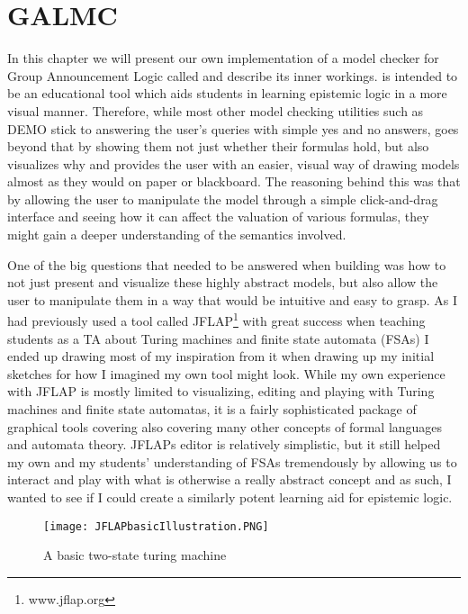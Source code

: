 \section{GALMC}\label{sec:impl}

In this chapter we will present our own implementation of a model checker for Group Announcement Logic called \cname{} and describe its inner workings. \cname{} is intended to be an educational tool which aids students in learning epistemic logic in a more visual manner. Therefore, while most other model checking utilities such as DEMO \cite{JanvanEijck} stick to answering the user's queries with simple yes and no answers, \cname{} goes beyond that by showing them not just whether their formulas hold, but also visualizes why and provides the user with an easier, visual way of drawing models almost as they would on paper or blackboard. The reasoning behind this was that by allowing the user to manipulate the model through a simple click-and-drag interface and seeing how it can affect the valuation of various formulas, they might gain a deeper understanding of the semantics involved.

One of the big questions that needed to be answered when building \cname{} was how to not just present and visualize these highly abstract models, but also allow the user to manipulate them in a way that would be intuitive and easy to grasp. As I had previously used a tool called JFLAP\footnote{www.jflap.org} with great success when teaching students as a TA about Turing machines and finite state automata (FSAs) I ended up drawing most of my inspiration from it when drawing up my initial sketches for how I imagined my own tool might look. While my own experience with JFLAP is mostly limited to visualizing, editing and playing with Turing machines and finite state automatas, it is a fairly sophisticated package of graphical tools covering also covering many other concepts of formal languages and automata theory. JFLAPs editor is relatively simplistic, but it still helped my own and my students' understanding of FSAs tremendously by allowing us to interact and play with what is otherwise a really abstract concept and as such, I wanted to see if I could create a similarly potent learning aid for epistemic logic. 

\begin{figure}[H]
	\texttt{[image: JFLAPbasicIllustration.PNG]}
	\caption{A basic two-state turing machine}
	\label{fig:JFLAP_basic illustration}
\end{figure}

